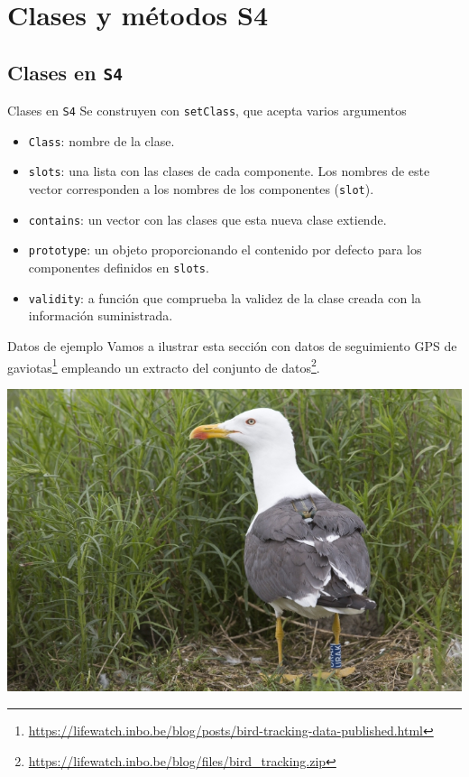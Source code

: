 \documentclass[xcolor={usenames,svgnames,dvipsnames}]{beamer}
\begin{document}
\section{Clases y métodos S4}
\label{sec:org4d62f9c}

\subsection{Clases en \texttt{S4}}
\label{sec:org1cf35d0}
\begin{frame}[label={sec:org604bcff},fragile]{Clases en \texttt{S4}}
 Se construyen con \texttt{setClass}, que acepta varios argumentos
\begin{itemize}
\item \texttt{Class}: nombre de la clase.
\item \texttt{slots}: una lista con las clases de cada componente. Los nombres de este vector corresponden a los nombres de los componentes (\texttt{slot}).
\item \texttt{contains}: un vector con las clases que esta nueva clase extiende.
\item \texttt{prototype}: un objeto proporcionando el contenido por defecto para los componentes definidos en \texttt{slots}.
\item \texttt{validity}: a función que comprueba la validez de la clase creada con la información suministrada.
\end{itemize}
\end{frame}

\begin{frame}[label={sec:org4d1e3de}]{Datos de ejemplo}
Vamos a ilustrar esta sección con datos de seguimiento GPS de gaviotas\footnote{\url{https://lifewatch.inbo.be/blog/posts/bird-tracking-data-published.html}} empleando un extracto del conjunto de datos\footnote{\url{https://lifewatch.inbo.be/blog/files/bird\_tracking.zip}}.
\begin{center}
\includegraphics[height=0.5\textheight]{figs/73915_lesser-black-backed-gull-with-transmitter.jpg}
\end{center}
\end{frame}
\end{document}
